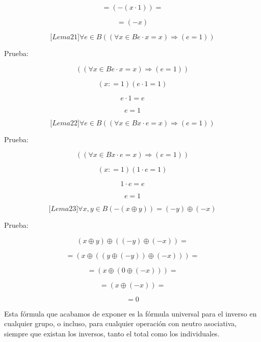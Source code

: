 \documentclass[
]{article}
\begin{document}
\begin{enumerate}
\begin{enumerate}
\begin{enumerate}
      \[{= \left( {- \left( {x \cdot 1} \right)} \right)} =\]

      \[= \left( {- x} \right)\]

      \[{\lbrack{{Lema}21}\rbrack}\forall{e \in B}\left( {\left( {\forall{x \in B}{{e \cdot x} = x}} \right)\Rightarrow\left( {e = 1} \right)} \right)\]

      Prueba:

      \[\left( {\left( {\forall{x \in B}{{e \cdot x} = x}} \right)\Rightarrow\left( {e = 1} \right)} \right)\]

      \[\left( {x{: = 1}} \right)\left( {{e \cdot 1} = 1} \right)\]

      \[{e \cdot 1} = e\]

      \[e = 1\]

      \[{\lbrack{{Lema}22}\rbrack}\forall{e \in B}\left( {\left( {\forall{x \in B}{{x \cdot e} = x}} \right)\Rightarrow\left( {e = 1} \right)} \right)\]

      Prueba:

      \[\left( {\left( {\forall{x \in B}{{x \cdot e} = x}} \right)\Rightarrow\left( {e = 1} \right)} \right)\]

      \[\left( {x{: = 1}} \right)\left( {{1 \cdot e} = 1} \right)\]

      \[{1 \cdot e} = e\]

      \[e = 1\]

      \[{\lbrack{{Lema}23}\rbrack}\forall x,{y \in B}{\left( {- \left( {x \oplus y} \right)} \right) = \left( {- y} \right)} \oplus \left( {- x} \right)\]

      Prueba:

      \[\left( {x \oplus y} \right) \oplus {\left( {\left( {- y} \right) \oplus \left( {- x} \right)} \right) =}\]

      \[{= \left( {x \oplus \left( {\left( {y \oplus \left( {- y} \right)} \right) \oplus \left( {- x} \right)} \right)} \right)} =\]

      \[{= \left( {x \oplus \left( {0 \oplus \left( {- x} \right)} \right)} \right)} =\]

      \[{= \left( {x \oplus \left( {- x} \right)} \right)} =\]

      \[= 0\]

      Esta fórmula que acabamos de exponer es la fórmula universal para
      el inverso en cualquier grupo, o in\-cluso, para cualquier
      operación con neutro asociativa, siempre que existan los inversos,
      tanto el total como los individuales.


\end{enumerate}
\end{enumerate}
\end{enumerate}
\end{document}
